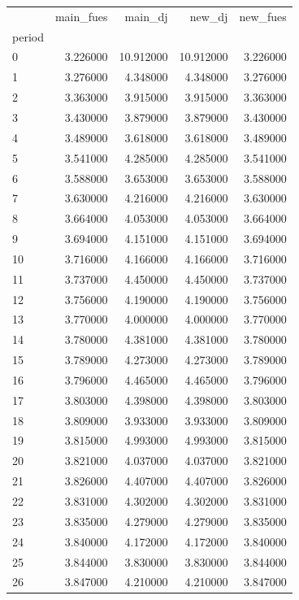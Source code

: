 \begin{tabular}{lrrrr}
\toprule
 & main_fues & main_dj & new_dj & new_fues \\
period &  &  &  &  \\
\midrule
0 & 3.226000 & 10.912000 & 10.912000 & 3.226000 \\
1 & 3.276000 & 4.348000 & 4.348000 & 3.276000 \\
2 & 3.363000 & 3.915000 & 3.915000 & 3.363000 \\
3 & 3.430000 & 3.879000 & 3.879000 & 3.430000 \\
4 & 3.489000 & 3.618000 & 3.618000 & 3.489000 \\
5 & 3.541000 & 4.285000 & 4.285000 & 3.541000 \\
6 & 3.588000 & 3.653000 & 3.653000 & 3.588000 \\
7 & 3.630000 & 4.216000 & 4.216000 & 3.630000 \\
8 & 3.664000 & 4.053000 & 4.053000 & 3.664000 \\
9 & 3.694000 & 4.151000 & 4.151000 & 3.694000 \\
10 & 3.716000 & 4.166000 & 4.166000 & 3.716000 \\
11 & 3.737000 & 4.450000 & 4.450000 & 3.737000 \\
12 & 3.756000 & 4.190000 & 4.190000 & 3.756000 \\
13 & 3.770000 & 4.000000 & 4.000000 & 3.770000 \\
14 & 3.780000 & 4.381000 & 4.381000 & 3.780000 \\
15 & 3.789000 & 4.273000 & 4.273000 & 3.789000 \\
16 & 3.796000 & 4.465000 & 4.465000 & 3.796000 \\
17 & 3.803000 & 4.398000 & 4.398000 & 3.803000 \\
18 & 3.809000 & 3.933000 & 3.933000 & 3.809000 \\
19 & 3.815000 & 4.993000 & 4.993000 & 3.815000 \\
20 & 3.821000 & 4.037000 & 4.037000 & 3.821000 \\
21 & 3.826000 & 4.407000 & 4.407000 & 3.826000 \\
22 & 3.831000 & 4.302000 & 4.302000 & 3.831000 \\
23 & 3.835000 & 4.279000 & 4.279000 & 3.835000 \\
24 & 3.840000 & 4.172000 & 4.172000 & 3.840000 \\
25 & 3.844000 & 3.830000 & 3.830000 & 3.844000 \\
26 & 3.847000 & 4.210000 & 4.210000 & 3.847000 \\

\end{tabular}
